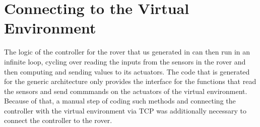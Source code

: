 \section{Connecting to the Virtual Environment}
\label{sec:connect_virtual_env}

The logic of the controller for the rover that us generated in \clang can then
run in an infinite loop, cycling over reading the inputs from the sensors in the
rover and then computing and sending values to its actuators. The \clang
code that is generated for the generic architecture only provides the
interface for the functions that read the sensors and send commmands on the
actuators of the virtual environment. Because of that, a manual step of
coding such methods and connecting the controller with the virtual environment
via TCP was additionally necessary to connect the controller to the rover. 
